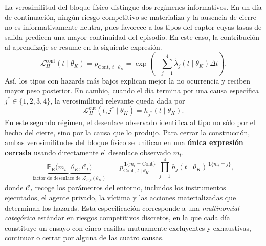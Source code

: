 \documentclass[12pt]{article}
\theoremstyle{definition}
\theoremstyle{remark}
\newcommand{\ProbE}{\mathbb{P}_{\mathrm{E}}}
\newcommand{\1}{\mathbf{1}}
\begin{document}
La verosimilitud del bloque físico distingue dos regímenes informativos. En un día de continuación, ningún riesgo competitivo se materializa y la ausencia de cierre no es informativamente neutra, pues favorece a los tipos del captor cuyas tasas de salida predicen una mayor continuidad del episodio. En este caso, la contribución al aprendizaje se resume en la siguiente expresión.
\begin{equation}
\label{eq:LH-cont}
\mathcal{L}_H^{\mathrm{cont}}(t \mid \theta_K)=p_{\mathrm{Cont},\,t\mid\theta_K}=\exp\left(-\sum_{j=1}^{4}\tilde{\lambda}_j(t\mid\theta_K)\Delta t\right).
\end{equation}
Así, los tipos con hazards más bajos explican mejor la no ocurrencia y reciben mayor peso posterior. En cambio, cuando el día termina por una causa específica $j^\ast\in\{1,2,3,4\}$, la verosimilitud relevante queda dada por
\begin{equation}
\label{eq:LH-out}
\mathcal{L}_H^{\mathrm{out}}(t,j^\ast \mid \theta_K)=h_{j^\ast}(t \mid \theta_K).
\end{equation}
En este segundo régimen, el desenlace observado identifica al tipo no sólo por el hecho del cierre, sino por la causa que lo produjo. Para cerrar la construcción, ambas verosimilitudes del bloque físico se unifican en una \textbf{única expresión cerrada} usando directamente el desenlace observado $m_t$.
\begin{equation}
\label{eq:LH-compacta}
\underbrace{\ProbE\bigl(m_t \,\big|\, \theta_K,\mathcal C_t\bigr)}_{\displaystyle\text{factor de desenlace de }\mathcal{L}_{F,t}(\theta_K)}
\;=\;
p_{\mathrm{Cont},\,t\mid\theta_K}^{\,\mathbf{1}\{m_t=\mathrm{Cont}\}}
\;\prod_{j=1}^{4} h_j(t\mid\theta_K)^{\,\mathbf{1}\{m_t=j\}},
\end{equation}
donde $\mathcal C_t$ recoge los parámetros del entorno, incluidos los instrumentos ejecutados, el agente privado, la víctima y las acciones materializadas que determinan los hazards. Esta especificación corresponde a una \emph{multinomial categórica} estándar en riesgos competitivos discretos, en la que cada día constituye un ensayo con cinco casillas mutuamente excluyentes y exhaustivas, continuar o cerrar por alguna de las cuatro causas.
\end{document}
